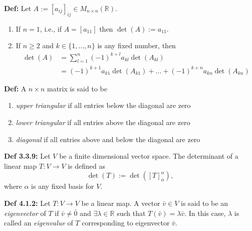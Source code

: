 \bigskip 

\noindent 
\textbf{Def:} Let $A := [a_{ij}]_{ij} \in M_{n \times n}(\mathbb{R})$.
\begin{enumerate}
    \item If $n = 1$, i.e., if $A = [a_{11}]$ then $\det(A) := a_{11}$.
    \item If $n \ge 2$ and $k \in \{1, \ldots , n \}$ is any fixed number, then 
\begin{align*}
    \det(A) &= \sum_{l = 1}^{n} (-1)^{k + l} a_{kl} \det(A_{kl}) \\
            &= (-1)^{k + 1} a_{k1} \det(A_{k1}) + \ldots + (-1)^{k + n} a_{kn} \det(A_{kn}) 
\end{align*}
\end{enumerate}

\noindent 
\textbf{Def:} A $n \times n$ matrix is said to be 
\begin{enumerate}
    \item \textit{upper triangular} if all entries below the diagonal are zero
    \item \textit{lower triangular} if all entries above the diagonal are zero
    \item \textit{diagonal} if all entries above and below the diagonal are zero
\end{enumerate}

\bigskip 

\noindent 
\textbf{Def 3.3.9:} Let $V$ be a finite dimensional vector space. The determinant of a linear map $T:V\rightarrow V$ is defined as 
\[\det(T) := \det([T]_\alpha^\alpha),\] 
where $\alpha$ is any fixed basis for $V$.

\bigskip 

\noindent 
\textbf{Def 4.1.2:} Let $T: V \rightarrow V$ be a linear map. A vector $\bar v \in V$ is said to be an \textit{eigenvector} of $T$ if $\bar v \ne \bar 0$ and $\exists \lambda \in \mathbb{R}$ such that $T(\bar v)=\lambda \bar v$. In this case, $\lambda$ is called an \textit{eigenvalue} of $T$ corresponding to eigenvector $\bar v$.